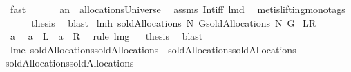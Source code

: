 \begin{isabellebody}
\ fast\ \isamarkupfalse%
\ \isamarkupfalse%
\ \isanewline
\ \ {\isachardoublequoteopen}a{\isacharminus}{\isacharminus}n\ {\isasymin}\ allocationsUniverse{\isachardoublequoteclose}\ \isamarkupfalse%
\ assms{\isacharparenleft}{}{\isacharparenright}\ Int{\isacharunderscore}iff\ lm{}{}d\ \isamarkupfalse%
\ {\isacharparenleft}metis{\isacharparenleft}lifting{\isacharcomma}mono{\isacharunderscore}tags{\isacharparenright}{\isacharparenright}\ \isanewline
\ \ \isamarkupfalse%
\ \isamarkupfalse%
\ {\isacharquery}thesis\ \isamarkupfalse%
\ blast\isanewline
{}\isamarkupfalse%
%
\endisatagproof
{\isafoldproof}%
%
\isadelimproof
\isanewline
%
\endisadelimproof
\isanewline
{}\isamarkupfalse%
\ lm{}{}h{\isacharcolon}\ {\isachardoublequoteopen}soldAllocations{\isacharprime}{\isacharprime}\ N\ G{\isacharequal}soldAllocations{\isacharprime}{\isacharprime}{\isacharprime}\ N\ G{\isachardoublequoteclose}\isanewline
{\isacharparenleft}\ {\isachardoublequoteopen}{\isacharquery}L{\isacharequal}{\isacharquery}R{\isachardoublequoteclose}{\isacharparenright}%
\isadelimproof
\ %
\endisadelimproof
%
\isatagproof
{}\isamarkupfalse%
\ {\isacharminus}\ \isacommand{{\isacharbraceleft}}\isamarkupfalse%
\isamarkupfalse%
\ a\ \isamarkupfalse%
\ {\isachardoublequoteopen}a\ {\isasymin}\ {\isacharquery}L\ {\isacharequal}\ {\isacharparenleft}a\ {\isasymin}\ {\isacharquery}R{\isacharparenright}{\isachardoublequoteclose}\ \isamarkupfalse%
\ {\isacharparenleft}rule\ lm{}{}g{\isacharparenright}\isacommand{{\isacharbraceright}}\isamarkupfalse%
\ \isamarkupfalse%
\ {\isacharquery}thesis\ \isamarkupfalse%
\ blast\ \isamarkupfalse%
%
\endisatagproof
{\isafoldproof}%
%
\isadelimproof
%
\endisadelimproof
\isanewline
\isanewline
{}\isamarkupfalse%
\ lm{}{}e{\isacharcolon}\ {\isachardoublequoteopen}soldAllocations{\isacharequal}soldAllocations{\isacharprime}\ {\isacharampersand}\ soldAllocations{\isacharprime}{\isacharequal}soldAllocations{\isacharprime}{\isacharprime}\ {\isacharampersand}\isanewline
soldAllocations{\isacharprime}{\isacharprime}{\isacharequal}soldAllocations{\isacharprime}{\isacharprime}{\isacharprime}{\isachardoublequoteclose}%
\isadelimproof
\ %
\endisadelimproof
%
\isatagproof
{}\isamarkupfalse%

\end{isabellebody}
